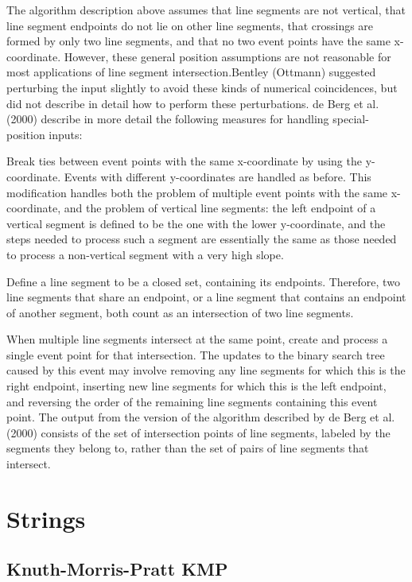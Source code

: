 \documentclass[10pt,letterpaper,twocolumn,twosided]{article}
\begin{document}
The algorithm description above assumes that line segments are not vertical, that line segment endpoints do not lie on other line segments, that crossings are formed by only two line segments, and that no two event points have the same x-coordinate. However, these general position assumptions are not reasonable for most applications of line segment intersection.Bentley (Ottmann) suggested perturbing the input slightly to avoid these kinds of numerical coincidences, but did not describe in detail how to perform these perturbations. de Berg et al. (2000) describe in more detail the following measures for handling special-position inputs:

Break ties between event points with the same x-coordinate by using the y-coordinate. Events with different y-coordinates are handled as before. This modification handles both the problem of multiple event points with the same x-coordinate, and the problem of vertical line segments: the left endpoint of a vertical segment is defined to be the one with the lower y-coordinate, and the steps needed to process such a segment are essentially the same as those needed to process a non-vertical segment with a very high slope.

Define a line segment to be a closed set, containing its endpoints. Therefore, two line segments that share an endpoint, or a line segment that contains an endpoint of another segment, both count as an intersection of two line segments.

When multiple line segments intersect at the same point, create and process a single event point for that intersection. The updates to the binary search tree caused by this event may involve removing any line segments for which this is the right endpoint, inserting new line segments for which this is the left endpoint, and reversing the order of the remaining line segments containing this event point. The output from the version of the algorithm described by de Berg et al. (2000) consists of the set of intersection points of line segments, labeled by the segments they belong to, rather than the set of pairs of line segments that intersect.

\section{Strings}

\subsection{Knuth-Morris-Pratt KMP}
\end{document}
